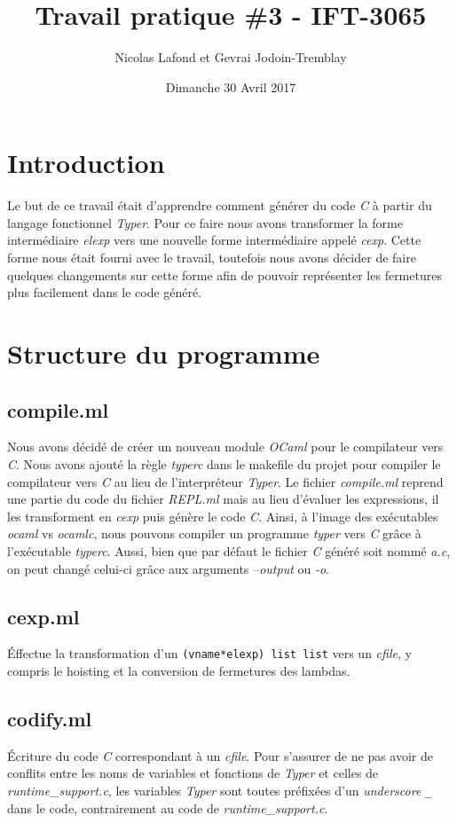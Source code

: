 \documentclass{article}
\begin{document}
\title{Travail pratique \#3 - IFT-3065}
\author{Nicolas Lafond et Gevrai Jodoin-Tremblay}
\date{Dimanche 30 Avril 2017}
\maketitle

\section{Introduction}
Le but de ce travail était d'apprendre comment générer du code \emph{C} à partir
du langage fonctionnel \emph{Typer}. Pour ce faire nous avons transformer la
forme intermédiaire \emph{elexp} vers une nouvelle forme intermédiaire appelé
\emph{cexp}. Cette forme nous était fourni avec le travail, toutefois nous avons
décider de faire quelques changements sur cette forme afin de pouvoir
représenter les fermetures plus facilement dans le code généré.

\section{Structure du programme}
\subsection{compile.ml}
Nous avons décidé de créer un nouveau module \emph{OCaml} pour le compilateur
vers \emph{C}.
Nous avons ajouté la règle \emph{typerc} dans le makefile du projet pour compiler
le compilateur vers \emph{C} au lieu de l'interpréteur \emph{Typer}. Le fichier
\emph{compile.ml}
reprend une partie du code du fichier \emph{REPL.ml} mais au lieu d'évaluer
les expressions, il les transforment en \emph{cexp} puis génère le code \emph{C}. Ainsi,
à l'image des exécutables \emph{ocaml} vs \emph{ocamlc}, nous pouvons compiler
un programme \emph{typer} vers \emph{C} grâce à l'exécutable \emph{typerc}.
Aussi, bien que par défaut le fichier \emph{C} généré soit nommé \emph{a.c},
on peut changé celui-ci grâce aux arguments \emph{--output} ou \emph{-o}.

\subsection{cexp.ml}
Éffectue la transformation d'un \texttt{(vname*elexp) list list} vers un
\emph{cfile}, y compris le hoisting et la conversion de fermetures des lambdas.

\subsection{codify.ml}
Écriture du code \emph{C} correspondant à un \emph{cfile}. Pour s'assurer de ne
pas avoir de conflits entre les noms de variables et fonctions de \emph{Typer}
et celles de \emph{runtime\_support.c}, les variables \emph{Typer} sont toutes
préfixées d'un \emph{underscore} \texttt{\_} dans le code, contrairement au code
de \emph{runtime\_support.c}.
\end{document}
